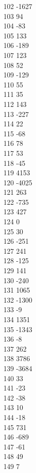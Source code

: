 { 102	-1627 \\
 103	94 \\
 104	-83 \\
 105	133 \\
 106	-189 \\
 107	123 \\
 108	52 \\
 109	-129 \\
 110	55 \\
 111	35 \\
 112	143 \\
 113	-227 \\
 114	22 \\
 115	-68 \\
 116	78 \\
 117	53 \\
 118	-45 \\
 119	4153 \\
 120	-4025 \\
 121	263 \\
 122	-735 \\
 123	427 \\
 124	0 \\
 125	30 \\
 126	-251 \\
 127	241 \\
 128	-125 \\
 129	141 \\
 130	-240 \\
 131	1065 \\
 132	-1300 \\
 133	-9 \\
 134	1351 \\
 135	-1343 \\
 136	-8 \\
 137	262 \\
 138	3786 \\
 139	-3684 \\
 140	33 \\
 141	-23 \\
 142	-38 \\
 143	10 \\
 144	-18 \\
 145	731 \\
 146	-689 \\
 147	-61 \\
 148	49 \\
 149	7 \\
}
